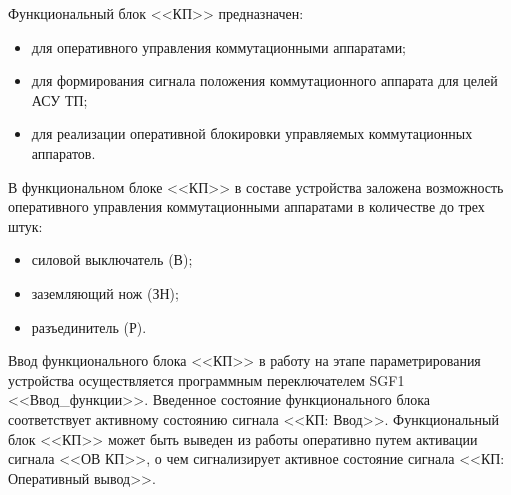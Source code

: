 
\begin{flushleft}
\color{black}
\nopagebreak
\vspace{3mm}
\end{flushleft}


\begin{flushleft}
\color{black}
\nopagebreak
\end{flushleft}

Функциональный блок <<КП>> предназначен:
\begin{itemize}
\item для оперативного управления коммутационными аппаратами; 
\item для формирования сигнала положения коммутационного аппарата для целей АСУ ТП; 
\item для реализации оперативной блокировки управляемых коммутационных аппаратов.
\end{itemize}

В функциональном блоке <<КП>> в составе устройства заложена возможность оперативного управления коммутационными аппаратами в количестве до трех штук: 
\begin{itemize}
\item силовой выключатель (В);
\item заземляющий нож (ЗН);
\item разъединитель (Р).
\end{itemize}

\par
Ввод функционального блока <<КП>> в работу на этапе параметрирования устройства осуществляется программным переключателем SGF1 <<Ввод\_функции>>. Введенное состояние функционального блока соответствует активному состоянию сигнала <<КП: Ввод>>. Функциональный блок <<КП>> может быть выведен из работы оперативно путем активации сигнала <<ОВ КП>>, о чем сигнализирует активное состояние сигнала <<КП: Оперативный вывод>>.

